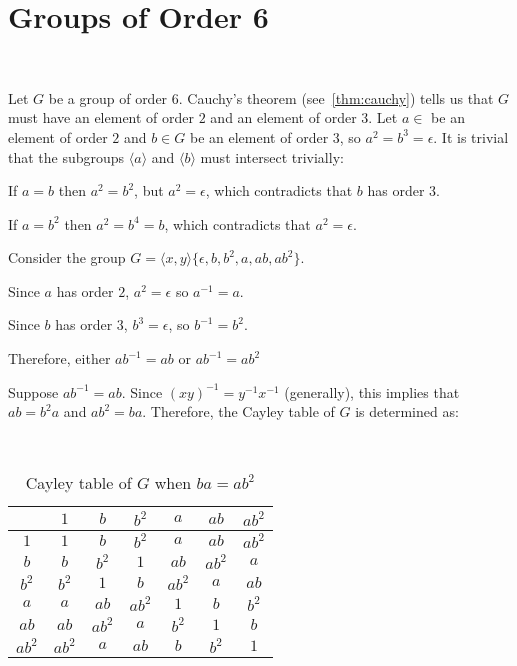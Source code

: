 \section{Groups of Order 6}~\label{sec:groups-order-6}

Let $G$ be a group of order $6$.
Cauchy's theorem (see~\ref{thm:cauchy}) tells us that $G$ must have
an element of order $2$ and an element of order $3$.
Let $a \in$ be an element of order $2$ and $b \in G$ be an element of order $3$,
so $a^2 = b^3 = \epsilon$.
It is trivial that the subgroups $\langle a \rangle$ and $\langle b \rangle$
must intersect trivially:
\begin{enumalph}
  \item If $a = b$ then $a^2 = b^2$, but $a^2 = \epsilon$, which contradicts that $b$ has order $3$.
  \item If $a = b^2$ then $a^2 = b^4 = b$, which contradicts that $a^2 = \epsilon$.
\end{enumalph}
Consider the group $G = \langle x, y \rangle  \{ \epsilon, b, b^2, a, ab, ab^2 \}$.
\begin{enumalph}
  \item Since $a$ has order $2$, $a^2 = \epsilon$ so $a^{-1} = a$.
  \item Since $b$ has order $3$, $b^3 = \epsilon$, so $b^{-1} = b^2$.
  \item Therefore, either ${ab}^{-1} = ab$ or ${ab}^{-1} = ab^2$
\end{enumalph}

Suppose ${ab}^{-1} = ab$.
Since ${(xy)}^{-1} = y^{-1}x^{-1}$ (generally), this implies that
$ab = b^2a$ and $ab^2 = ba$.
Therefore, the Cayley table of $G$ is determined as:

\begin{center}
  \begin{table}[H]~\label{tab:cayley-table-order-6=a}
    \begin{tabular}{|c|c|c|c|c|c|c|}
      \hline
      & $1$ & $b$ & $b^2$ & $a$ & $ab$ & $ab^2$ \\
      \midrule
      $1$ & $1$ & $b$ & $b^2$ & $a$ & $ab$ & $ab^2$ \\
      $b$ & $b$ & $b^2$ & $1$ & $ab$ & $ab^2$ & $a$ \\
      $b^2$ & $b^2$ & $1$ & $b$ & $ab^2$ & $a$ & $ab$ \\
      $a$ & $a$ & $ab$ & $ab^2$ & $1$ & $b$ & $b^2$ \\
      $ab$ & $ab$ & $ab^2$ & $a$ & $b^2$ & $1$ & $b$ \\
      $ab^2$ & $ab^2$ & $a$ & $ab$ & $b$ & $b^2$ & $1$ \\
      \bottomrule
    \end{tabular}
    \caption{Cayley table of $G$ when $ba = ab^2$}
  \end{table}
\end{center}

